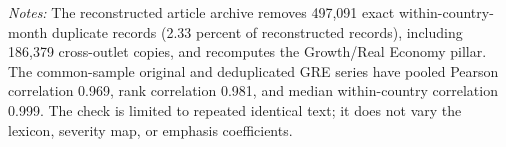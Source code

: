 \begin{table}[htbp]
\centering\small
\caption{Article-level exact-text deduplication sensitivity at the one-month horizon}
\label{tab:dedup_gre}
\vspace{0.35em}
\begin{minipage}{0.97\textwidth}\normalsize\textit{Notes:} The reconstructed article archive removes 497,091 exact within-country-month duplicate records (2.33 percent of reconstructed records), including 186,379 cross-outlet copies, and recomputes the Growth/Real Economy pillar. The common-sample original and deduplicated GRE series have pooled Pearson correlation 0.969, rank correlation 0.981, and median within-country correlation 0.999. The check is limited to repeated identical text; it does not vary the lexicon, severity map, or emphasis coefficients.\end{minipage}
\end{table}
